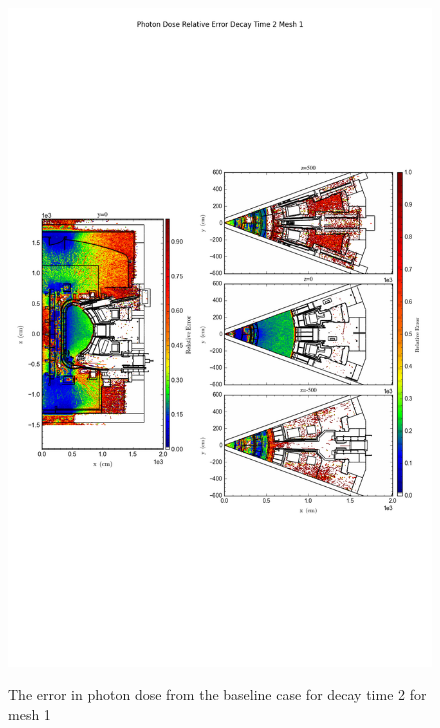 \begin{figure}[ht!]
\centering
\includegraphics[trim={0cm 9cm 0cm 10cm},clip,scale=0.75]{../plots/final_model/Photon_Dose_Relative_Error_Decay_Time_2_Mesh_1.png}
\label{fig:photons_dc2_no4bc_m1_error}
\caption{The error in photon dose from the baseline case for decay time 2 for mesh 1}
\end{figure}

